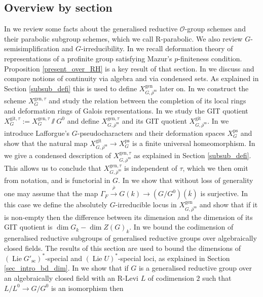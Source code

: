 \documentclass{amsart}
\theoremstyle{definition}
\theoremstyle{remark}
\newcommand{\OO}{\mathcal O}
\newcommand{\rhobar}{\overline{\rho}}
\newcommand{\ps}{\mathrm{ps}}
\newcommand{\gen}{\mathrm{gen}}
\DeclareMathOperator{\Lie}{Lie}
\newcommand{\kbar}{\overline{k}}
\newcommand{\rhobarss}{\rhobar^{\mathrm{ss}}}
\newcommand{\git}{\mathrm{git}}
\newcommand{\sic}{\operatorname{sc}}
\begin{document}
\subsection{Overview by section} In  we review some facts about the generalised reductive $\OO$-group
schemes and their parabolic subgroup schemes, which we call R-parabolic. We also review $G$-semisimplification 
and $G$-irreducibility. In 
we recall deformation theory of representations
of a profinite group satisfying Mazur's $p$-finiteness condition. Proposition \ref{present_over_RH} is a key result of that section. In  we discuss and compare notions of continuity via algebra and via condensed sets. As explained in 
Section \ref{subsub_defi} this is used to define $X^{\gen}_{G,\rhobarss}$ later on. 
In  we construct the scheme $X^{\gen,\tau}_G$ and study the relation 
between the completion of its local rings and deformation rings of Galois representations. 
In  we study the GIT quotient $X^{\git, \tau}_G:=X^{\gen,\tau}_G\sslash G^0$ 
and define $X^{\gen,\tau}_{G,\rhobarss}$ and its GIT quotient $X^{\git}_{G,\rhobarss}$.
In  we introduce Lafforgue's $G$-pseudocharacters and their deformation spaces $X^{\ps}_G$ and 
show that the natural map $X^{\git}_{G,\rhobarss}\rightarrow X^{\ps}_G$ is a finite universal homeomorphism. 
In  we give a condensed description of $X^{\gen,\tau}_{G,\rhobarss}$ as explained in Section \ref{subsub_defi}. 
This allows us to conclude that $X^{\gen,\tau}_{G,\rhobarss}$ is independent of $\tau$, which we then omit from notation, 
and is functorial in $G$. 
In  we show that without loss of generality one may assume that the map $\Gamma_F \overset{\rhobar}{\longrightarrow} G(k) \rightarrow (G/G^0)(\kbar)$
is surjective. In this case we define the absolutely $G$-irreducible locus in $X^{\gen}_{G, \rhobarss}$ and show that 
if it is non-empty then the difference between its dimension and the dimension of its GIT quotient is $\dim G_k  - \dim Z(G)_k$. 
In  we bound the codimension of generalised reductive subgroups of generalised reductive groups 
over algebraically closed fields. The results of this section are used to bound the dimensions of 
$(\Lie G'_{\sic})^{\ast}$-special and $(\Lie U)^{\ast}$-special loci, 
 as explained in Section \ref{sec_intro_bd_dim}. 
In  we show that if $G$ is a generalised reductive group over an algebraically closed field with an R-Levi $L$ of codimension $2$ 
such that $L/L^0\rightarrow G/G^0$ is an isomorphism then 
\end{document}
